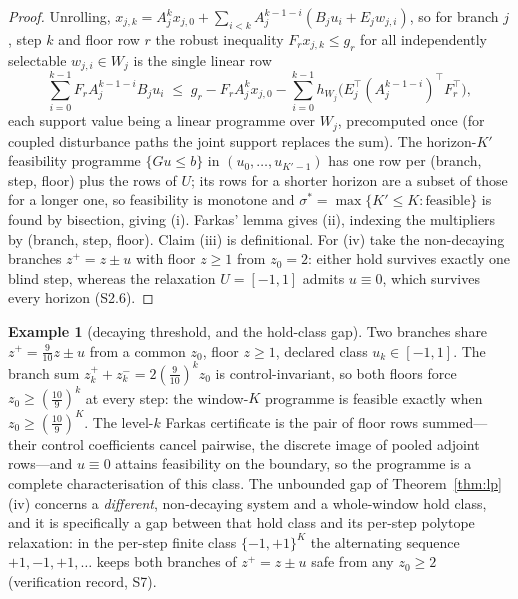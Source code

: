 \documentclass[11pt,a4paper]{article}
\theoremstyle{plain}
\theoremstyle{definition}
\newtheorem{example}[theorem]{Example}
\theoremstyle{remark}
\begin{document}
\begin{proof}
Unrolling, $x_{j,k}=A_j^kx_{j,0}+\sum_{i<k}A_j^{k-1-i}(B_ju_i+E_jw_{j,i})$, so for branch $j$, step $k$ and floor row $r$ the robust inequality $F_rx_{j,k}\le g_r$ for all independently selectable $w_{j,i}\in W_j$ is the single linear row
\begin{equation}\label{eq:lprow}
\sum_{i=0}^{k-1}F_rA_j^{k-1-i}B_ju_i\;\le\;g_r-F_rA_j^kx_{j,0}-\sum_{i=0}^{k-1}h_{W_j}\!\bigl(E_j^\top(A_j^{k-1-i})^\top F_r^\top\bigr),
\end{equation}
each support value being a linear programme over $W_j$, precomputed once (for coupled disturbance paths the joint support replaces the sum). The horizon-$K'$ feasibility programme $\{Gu\le b\}$ in $(u_0,\dots,u_{K'-1})$ has one row per (branch, step, floor) plus the rows of $U$; its rows for a shorter horizon are a subset of those for a longer one, so feasibility is monotone and $\sigma^*=\max\{K'\le K:\text{feasible}\}$ is found by bisection, giving (i). Farkas' lemma gives (ii), indexing the multipliers by (branch, step, floor). Claim (iii) is definitional. For (iv) take the non-decaying branches $z^+=z\pm u$ with floor $z\ge1$ from $z_0=2$: either hold survives exactly one blind step, whereas the relaxation $U=[-1,1]$ admits $u\equiv0$, which survives every horizon (S2.6).
\end{proof}

\begin{example}[decaying threshold, and the hold-class gap]\label{ex:relax-gap}
Two branches share $z^+=\tfrac9{10}z\pm u$ from a common $z_0$, floor $z\ge1$, declared class $u_k\in[-1,1]$. The branch sum $z^+_k+z^-_k=2(\tfrac9{10})^kz_0$ is control-invariant, so both floors force $z_0\ge(\tfrac{10}9)^k$ at every step: the window-$K$ programme is feasible exactly when $z_0\ge(\tfrac{10}9)^K$. The level-$k$ Farkas certificate is the pair of floor rows summed---their control coefficients cancel pairwise, the discrete image of pooled adjoint rows---and $u\equiv0$ attains feasibility on the boundary, so the programme is a complete characterisation of this class. The unbounded gap of Theorem~\ref{thm:lp}(iv) concerns a \emph{different}, non-decaying system and a whole-window hold class, and it is specifically a gap between that hold class and its per-step polytope relaxation: in the per-step finite class $\{-1,+1\}^K$ the alternating sequence $+1,-1,+1,\dots$ keeps both branches of $z^+=z\pm u$ safe from any $z_0\ge2$ (verification record, S7).
\end{example}
\end{document}
